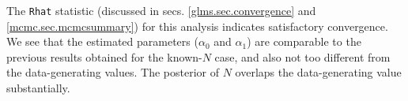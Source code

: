 The \mbox{\tt Rhat} statistic (discussed in secs. \ref{glms.sec.convergence} and
\ref{mcmc.sec.mcmcsummary}) for this analysis indicates satisfactory
convergence. 
We see that the
estimated parameters ($\alpha_0$ and $\alpha_1$) are comparable to the
previous results obtained for the known-$N$ case, and also not too
different from the data-generating values. The posterior of $N$
overlaps the data-generating value substantially. 

